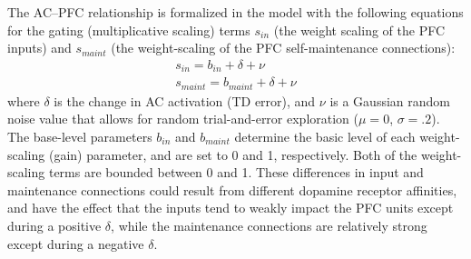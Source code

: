 The AC--PFC relationship is formalized in the model with the following equations for the gating (multiplicative scaling) terms $s_{in}$ (the weight scaling of the PFC inputs) and $s_{maint}$ (the weight-scaling of the PFC self-maintenance connections):
\begin{eqnarray}
  s_{in} = b_{in} + \delta + \nu\\
  s_{maint} = b_{maint} + \delta + \nu
  \label{eq.pfc_gain_mod}
\end{eqnarray}
where $\delta$ is the change in AC activation (TD error), and $\nu$ is a Gaussian random noise value that allows for random trial-and-error exploration ($\mu=0$, $\sigma=.2$).  The base-level parameters $b_{in}$ and $b_{maint}$ determine the basic level of each weight-scaling (gain) parameter, and are set to 0 and 1, respectively.  Both of the weight-scaling terms are bounded between 0 and 1.  These differences in input and maintenance connections could result from different dopamine receptor affinities, and have the effect that the inputs tend to weakly impact the PFC units except during a positive $\delta$, while the maintenance connections are relatively strong except during a negative
$\delta$.

